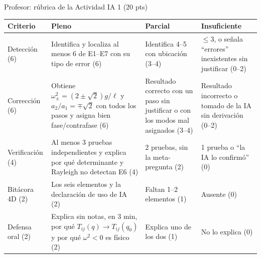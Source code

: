 \documentclass[spanish]{beamer}
\begin{document}
\begin{frame}{Profesor: rúbrica de la Actividad IA 1 (20 pts)}
\scriptsize\setlength{\tabcolsep}{3pt}
\begin{tabular}{@{}L{0.15\textwidth}L{0.30\textwidth}L{0.24\textwidth}L{0.21\textwidth}@{}}
\toprule
\textbf{Criterio} & \textbf{Pleno} & \textbf{Parcial} & \textbf{Insuficiente}\\
\midrule
Detección (6) & Identifica y localiza al menos 6 de E1--E7 con su tipo de error (6) & Identifica 4--5 con ubicación (3--4) & $\le3$, o señala ``errores'' inexistentes sin justificar (0--2) \\
Corrección (6) & Obtiene $\omega_\pm^2=(2\pm\sqrt2)g/\ell$ y $a_2/a_1=\mp\sqrt2$ con todos los pasos y asigna bien fase/contrafase (6) & Resultado correcto con un paso sin justificar o con los modos mal asignados (3--4) & Resultado incorrecto o tomado de la IA sin derivación (0--2) \\
Verificación (4) & Al menos 3 pruebas independientes y explica por qué determinante y Rayleigh no detectan E6 (4) & 2 pruebas, sin la meta-pregunta (2) & 1 prueba o ``la IA lo confirmó'' (0) \\
Bitácora 4D (2) & Los seis elementos y la declaración de uso de IA (2) & Faltan 1--2 elementos (1) & Ausente (0) \\
Defensa oral (2) & Explica sin notas, en 3 min, por qué $T_{ij}(q)\to T_{ij}(q_0)$ y por qué $\omega^2<0$ es físico (2) & Explica uno de los dos (1) & No lo explica (0) \\
\bottomrule
\end{tabular}
\end{frame}
\end{document}
